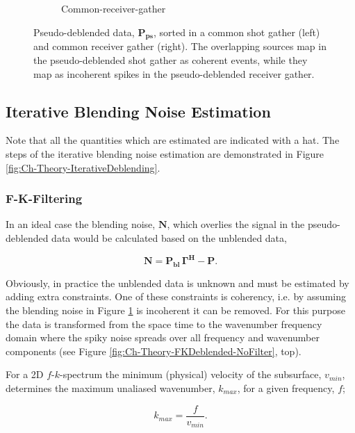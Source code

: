 \begin{figure}
\begin{subfigure}[t]{0.25\textwidth}
		\caption{Common-receiver-gather}
		\label{fig:Ch-Theory-PseudoDeblendedCRG}
	\end{subfigure}
	\caption{Pseudo-deblended data, $\mathbf{P_{ps}}$, sorted in a common shot gather (left) and common receiver gather (right). The overlapping sources map in the pseudo-deblended shot gather as coherent events, while they map as incoherent spikes in the pseudo-deblended receiver gather.}
	\label{fig:Ch-Theory-PseudoDeblended}

\end{figure}

\subsection{Iterative Blending Noise Estimation}

Note that all the quantities which are estimated are indicated with a hat. The steps of the iterative blending noise estimation are demonstrated in Figure \ref{fig:Ch-Theory-IterativeDeblending}.

\subsubsection*{F-K-Filtering}
In an ideal case the blending noise, $\mathbf{N}$, which overlies the signal in the pseudo-deblended data would be calculated based on the unblended data,

\begin{equation}
	\mathbf{N} = \mathbf{P_{bl}} \, \mathbf{\Gamma^H} - \mathbf{P}.
	\label{eq:Ch-Theory-Noise}
\end{equation}

Obviously, in practice the unblended data is unknown and must be estimated by adding extra constraints. One of these constraints is coherency, i.e. by assuming the blending noise in Figure \ref{fig:Ch-Theory-PseudoDeblendedCRG} is incoherent it can be removed. For this purpose the data is transformed from the space time to the wavenumber frequency domain where the spiky noise spreads over all frequency and wavenumber components (see Figure \ref{fig:Ch-Theory-FKDeblended-NoFilter}, top). 


For a 2D $f$-$k$-spectrum the minimum (physical) velocity of the subsurface, $v_{min}$, determines the maximum unaliased wavenumber, $k_{max}$,  for a given frequency, $f$;

\begin{equation}
	k_{max} = \frac{f}{v_{min}}.
	\label{eq_Ch-Theory-MaxWavenmber}
\end{equation} 

